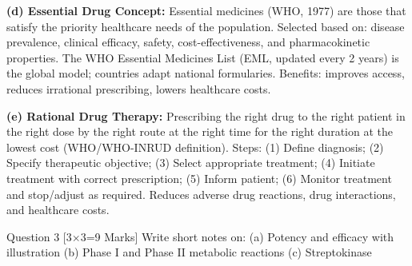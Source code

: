 \documentclass[11pt,a4paper]{article}
\begin{document}
\begin{ansbox}
\textbf{(d) Essential Drug Concept:}
Essential medicines (WHO, 1977) are those that satisfy the priority healthcare needs of the population. Selected based on: disease prevalence, clinical efficacy, safety, cost-effectiveness, and pharmacokinetic properties. The WHO Essential Medicines List (EML, updated every 2 years) is the global model; countries adapt national formularies. Benefits: improves access, reduces irrational prescribing, lowers healthcare costs.

\textbf{(e) Rational Drug Therapy:}
Prescribing the right drug to the right patient in the right dose by the right route at the right time for the right duration at the lowest cost (WHO/WHO-INRUD definition). Steps: (1) Define diagnosis; (2) Specify therapeutic objective; (3) Select appropriate treatment; (4) Initiate treatment with correct prescription; (5) Inform patient; (6) Monitor treatment and stop/adjust as required. Reduces adverse drug reactions, drug interactions, and healthcare costs.
\end{ansbox}

\begin{qbox}{Question 3 [3$\times$3=9 Marks]}
Write short notes on: (a) Potency and efficacy with illustration \quad (b) Phase I and Phase II metabolic reactions \quad (c) Streptokinase
\end{qbox}
\end{document}

